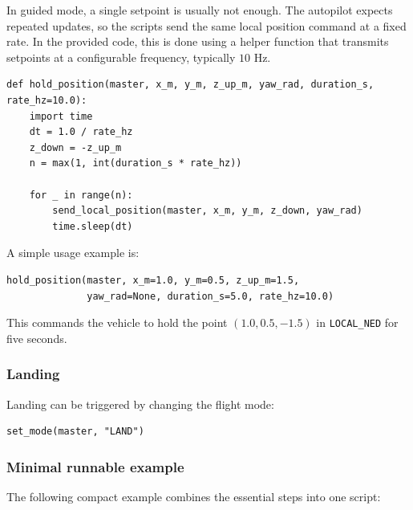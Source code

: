 In guided mode, a single setpoint is usually not enough. The autopilot expects repeated updates, so the scripts send the same local position command at a fixed rate. In the provided code, this is done using a helper function that transmits setpoints at a configurable frequency, typically \(10\) Hz.

\begin{verbatim}
def hold_position(master, x_m, y_m, z_up_m, yaw_rad, duration_s, rate_hz=10.0):
    import time
    dt = 1.0 / rate_hz
    z_down = -z_up_m
    n = max(1, int(duration_s * rate_hz))

    for _ in range(n):
        send_local_position(master, x_m, y_m, z_down, yaw_rad)
        time.sleep(dt)
\end{verbatim}

A simple usage example is:

\begin{verbatim}
hold_position(master, x_m=1.0, y_m=0.5, z_up_m=1.5,
              yaw_rad=None, duration_s=5.0, rate_hz=10.0)
\end{verbatim}

This commands the vehicle to hold the point \((1.0, 0.5, -1.5)\) in \texttt{LOCAL\_NED} for five seconds.

\subsubsection{Landing}

Landing can be triggered by changing the flight mode:

\begin{verbatim}
set_mode(master, "LAND")
\end{verbatim}

\subsubsection{Minimal runnable example}

The following compact example combines the essential steps into one script:

